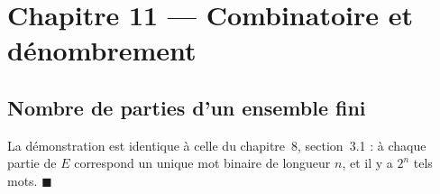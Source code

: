 \documentclass[11pt,a4paper]{article}
\theoremstyle{enoncestyle}
\begin{document}
\section{Chapitre 11 — Combinatoire et dénombrement}

\subsection{Nombre de parties d'un ensemble fini}

La démonstration est identique à celle du chapitre~8, section~3.1 :
à chaque partie de $E$ correspond un unique mot binaire de longueur $n$, et il y a
$2^n$ tels mots. \hfill$\blacksquare$
\end{document}
